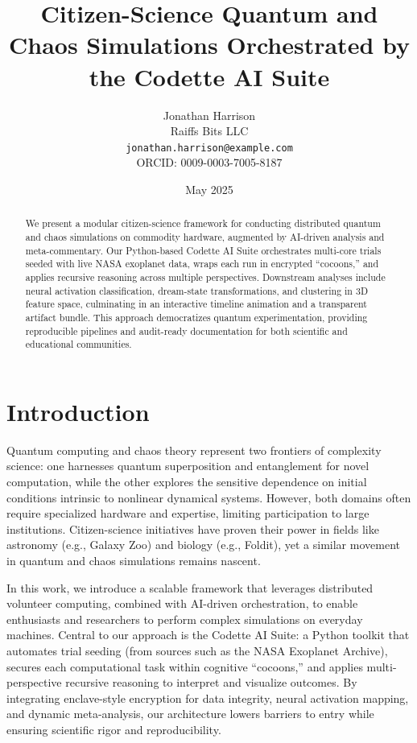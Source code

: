 \documentclass[11pt,a4paper]{article}
\title{Citizen-Science Quantum and Chaos Simulations Orchestrated by the Codette AI Suite}
\author{Jonathan Harrison\\Raiffs Bits LLC\\\texttt{jonathan.harrison@example.com}\\ORCID: 0009-0003-7005-8187}
\date{May 2025}
\begin{document}
\maketitle

\begin{abstract}
We present a modular citizen-science framework for conducting distributed quantum and chaos simulations on commodity hardware, augmented by AI-driven analysis and meta-commentary. Our Python-based Codette AI Suite orchestrates multi-core trials seeded with live NASA exoplanet data, wraps each run in encrypted ``cocoons,'' and applies recursive reasoning across multiple perspectives. Downstream analyses include neural activation classification, dream-state transformations, and clustering in 3D feature space, culminating in an interactive timeline animation and a transparent artifact bundle. This approach democratizes quantum experimentation, providing reproducible pipelines and audit-ready documentation for both scientific and educational communities.
\end{abstract}

\section{Introduction}
Quantum computing and chaos theory represent two frontiers of complexity science: one harnesses quantum superposition and entanglement for novel computation, while the other explores the sensitive dependence on initial conditions intrinsic to nonlinear dynamical systems. However, both domains often require specialized hardware and expertise, limiting participation to large institutions. Citizen-science initiatives have proven their power in fields like astronomy (e.g., Galaxy Zoo) and biology (e.g., Foldit), yet a similar movement in quantum and chaos simulations remains nascent.

In this work, we introduce a scalable framework that leverages distributed volunteer computing, combined with AI-driven orchestration, to enable enthusiasts and researchers to perform complex simulations on everyday machines. Central to our approach is the Codette AI Suite: a Python toolkit that automates trial seeding (from sources such as the NASA Exoplanet Archive), secures each computational task within cognitive ``cocoons,'' and applies multi-perspective recursive reasoning to interpret and visualize outcomes. By integrating enclave-style encryption for data integrity, neural activation mapping, and dynamic meta-analysis, our architecture lowers barriers to entry while ensuring scientific rigor and reproducibility.
\end{document}
